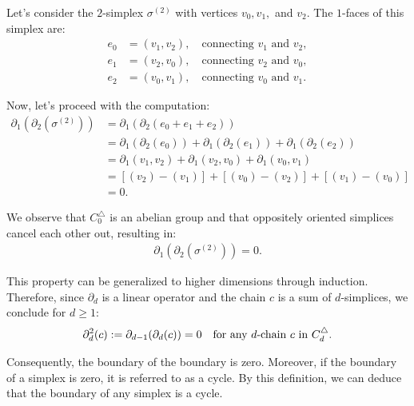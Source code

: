 \begin{example}
	Let's consider the \(2\)-simplex \( \sigma^{(2)} \) with vertices \( v_{0}, v_{1}, \) and \( v_{2} \). The \( 1 \)-faces of this simplex are:
	\begin{align}
		e_{0} & = (v_{1}, v_{2}), \quad \text{connecting } v_{1} \text{ and } v_{2}, \nonumber\\
		e_{1} & = (v_{2}, v_{0}), \quad \text{connecting } v_{2} \text{ and } v_{0}, \nonumber\\
		e_{2} & = (v_{0}, v_{1}), \quad \text{connecting } v_{0} \text{ and } v_{1}. 
	\end{align}
				
	Now, let's proceed with the computation:
	\begin{align}
		\partial_1(\partial_2(\sigma^{(2)})) & = \partial_1(\partial_2(e_{0} + e_{1} + e_{2})) \nonumber\\
		                                 & = \partial_1(\partial_2(e_{0})) + \partial_1(\partial_2(e_{1})) + \partial_1(\partial_2(e_{2})) \nonumber\\
		                                 & = \partial_1(v_{1}, v_{2}) + \partial_1(v_{2}, v_{0}) + \partial_1(v_{0}, v_{1}) \nonumber\\
		                                 & = [(v_{2}) - (v_{1})] + [(v_{0}) - (v_{2})] + [(v_{1}) - (v_{0})] \nonumber\\
		                                 & = 0.                                                                       
	\end{align}
				
	We observe that \( C^{\triangle}_{0} \) is an abelian group and that oppositely oriented simplices cancel each other out, resulting in:
	\begin{align}
		\partial_{1}(\partial_2(\sigma^{(2)})) = 0. 
	\end{align}
				
	This property can be generalized to higher dimensions through induction. Therefore, since \( \partial_d \) is a linear operator and the chain \( c \) is a sum of \( d \)-simplices, we conclude for $d \geq 1$:
	\begin{align}
		\partial^{2}_d(c) := \partial_{d-1}(\partial_{d}(c)) = 0 \quad \text{for any \( d \)-chain \( c \) in } C^{\triangle}_{d}. 
	\end{align}
				
	Consequently, the boundary of the boundary is zero. Moreover, if the boundary of a simplex is zero, it is referred to as a cycle. By this definition, we can deduce that the boundary of any simplex is a cycle.
\end{example}

